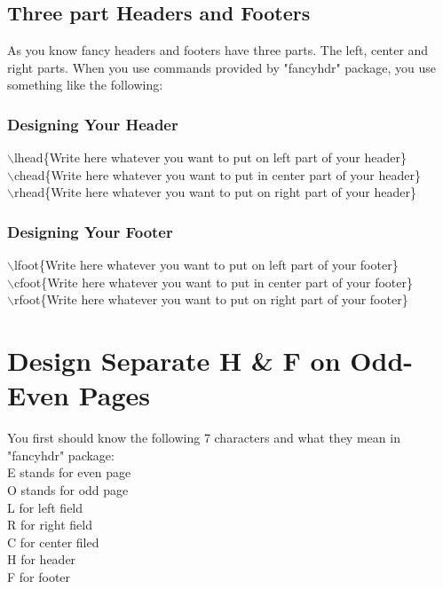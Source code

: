 \documentclass[]{book}
\begin{document}
\section{Three part Headers and Footers}
As you know fancy headers and footers have three parts. The left, center and right parts. When you use commands provided by "fancyhdr" package, you use something like the following:\\
\subsection{Designing Your Header}
$\backslash$lhead\{Write here whatever you want to put on left part of your header\}\\
$\backslash$chead\{Write here whatever you want to put in center part of your header\}\\
$\backslash$rhead\{Write here whatever you want to put on right part of your header\}\\
\subsection{Designing Your Footer}
$\backslash$lfoot\{Write here whatever you want to put on left part of your footer\}\\
$\backslash$cfoot\{Write here whatever you want to put in center part of your footer\}\\
$\backslash$rfoot\{Write here whatever you want to put on right part of your footer\}\\

\chapter{Design Separate H \& F on Odd-Even Pages}


You first should know the following 7 characters and what they mean in "fancyhdr" package:\\
E stands for even page\\
O stands for odd page\\
L for left field \\
R for right field\\
C for center filed\\
H for header\\
F for footer\\
\end{document}
